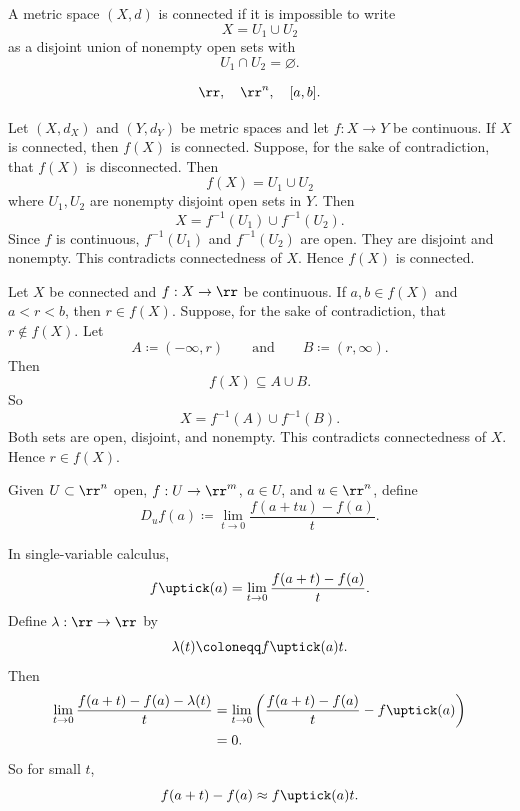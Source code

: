 

\begin{definition}[Connectedness]
	A metric space $(X,d)$ is connected if it is impossible to write
	\[
		X = U_1\cup U_2
	\]
	as a disjoint union of nonempty open sets with
	\[
		U_1\cap U_2 = \varnothing.
	\]
\end{definition}

\begin{example}
	\[
		\rr,\quad \rr^n,\quad [a,b].
	\]
\end{example}

\begin{theorem}{
	Let $(X,d_X)$ and $(Y,d_Y)$ be metric spaces and let $f:X\to Y$ be continuous.
	If $X$ is connected, then $f(X)$ is connected.
}
	Suppose, for the sake of contradiction, that $f(X)$ is disconnected.
	Then
	\[
		f(X) = U_1\cup U_2
	\]
	where $U_1,U_2$ are nonempty disjoint open sets in $Y$.
	Then
	\[
		X = f^{-1}(U_1)\cup f^{-1}(U_2).
	\]
	Since $f$ is continuous, $f^{-1}(U_1)$ and $f^{-1}(U_2)$ are open.
	They are disjoint and nonempty.
	This contradicts connectedness of $X$.
	Hence $f(X)$ is connected.
\end{theorem}

\begin{theorem}{
	Let $X$ be connected and $f:X\to\rr$ be continuous.
	If $a,b\in f(X)$ and $a < r < b$, then $r\in f(X)$.
}
	Suppose, for the sake of contradiction, that $r\notin f(X)$.
	Let
	\[
		A \coloneqq (-\infty,r)
		\qquad\text{and}\qquad
		B \coloneqq (r,\infty).
	\]
	Then
	\[
		f(X)\subseteq A\cup B.
	\]
	So
	\[
		X = f^{-1}(A)\cup f^{-1}(B).
	\]
	Both sets are open, disjoint, and nonempty.
	This contradicts connectedness of $X$.
	Hence $r\in f(X)$.
\end{theorem}

\begin{definition}
	Given $U\subset\rr^n$ open, $f:U\to\rr^m$, $a\in U$, and $u\in\rr^n$, define
	\[
		D_u f(a) \coloneqq \lim_{t\to0}\frac{f(a + tu) - f(a)}{t}.
	\]
\end{definition}

\begin{remark}
	In single-variable calculus,
	\[
		f\uptick(a) = \lim_{t\to 0}\frac{f(a + t) - f(a)}{t}.
	\]
	Define $\lambda:\rr\to\rr$ by
	\[
		\lambda(t) \coloneqq f\uptick(a)t.
	\]
	Then
	\begin{align*}
		\lim_{t\to0}\frac{f(a+t) - f(a) - \lambda(t)}{t}
		&= \lim_{t\to0}\left(\frac{f(a+t) - f(a)}{t} - f\uptick(a)\right)\\
		&= 0.
	\end{align*}
	So for small $t$,
	\[
		f(a+t) - f(a) \approx f\uptick(a)t.
	\]
\end{remark}

